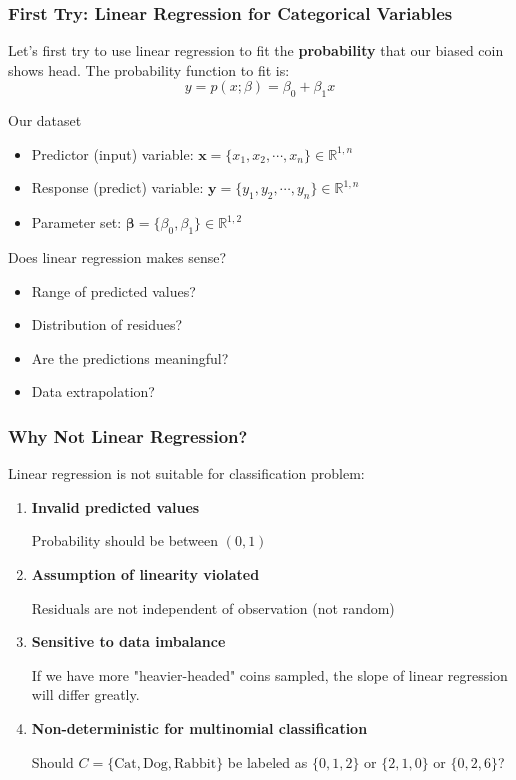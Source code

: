 \documentclass[10pt,aspectratio=169]{beamer}
\begin{document}
\begin{frame}
  \frametitle{First Try: Linear Regression for Categorical Variables}

  Let's first try to use linear regression to fit the \textbf{probability} that
  our biased coin shows head. The probability function to fit is:
  \begin{equation*}
    y = p(x; \mathbb{\beta}) = \beta_{0} + \beta_{1} x
  \end{equation*}

  \vfill
  Our dataset
  \begin{itemize}
  \item Predictor (input) variable: $\mathbf{x} = \{x_{1}, x_{2}, \cdots, x_{n}\} \in \mathbb{R}^{1, n}$
  \item Response (predict) variable: $\mathbf{y} = \{y_{1}, y_{2}, \cdots, y_{n}\} \in \mathbb{R}^{1, n}$
  \item Parameter set: $\mathbf{\beta} = \{\beta_{0}, \beta_{1}\} \in \mathbb{R}^{1, 2}$
  \end{itemize}

  \vfill
  Does linear regression makes sense?
  \begin{itemize}
  \item Range of predicted values?
  \item Distribution of residues?
  \item Are the predictions meaningful?
  \item Data extrapolation?
  \end{itemize}
\end{frame}  

  

  
  

\begin{frame}
  \frametitle{Why Not Linear Regression?}
  Linear regression is not suitable for classification problem:

  \begin{enumerate}
  \item \textbf{Invalid predicted values}

    Probability should be between $(0, 1)$
  
  \item \textbf{Assumption of linearity violated}

    Residuals are not independent of observation (not random)

  
  \item \textbf{Sensitive to data imbalance}

    If we have more "heavier-headed" coins sampled, the slope of linear regression will differ greatly.

    
  \item \textbf{Non-deterministic for multinomial classification}

    Should $C = \{\mathrm{Cat}, \mathrm{Dog}, \mathrm{Rabbit}\}$ be labeled as $\{0, 1, 2\}$ or $\{2, 1, 0\}$ or $\{0, 2, 6\}$?
    
  \end{enumerate}
\end{frame}
\end{document}
